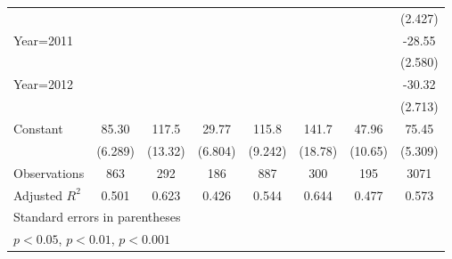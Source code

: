 \begin{table}[htbp]
\begin{tabular}{l*{7}{c}}
                &                  &                  &                  &                  &                  &                  &  (2.427)         \\
Year=2011       &                  &                  &                  &                  &                  &                  &   -28.55\sym{***}\\
                &                  &                  &                  &                  &                  &                  &  (2.580)         \\
Year=2012       &                  &                  &                  &                  &                  &                  &   -30.32\sym{***}\\
                &                  &                  &                  &                  &                  &                  &  (2.713)         \\
Constant        &    85.30\sym{***}&    117.5\sym{***}&    29.77\sym{***}&    115.8\sym{***}&    141.7\sym{***}&    47.96\sym{***}&    75.45\sym{***}\\
                &  (6.289)         &  (13.32)         &  (6.804)         &  (9.242)         &  (18.78)         &  (10.65)         &  (5.309)         \\
\midrule
Observations    &      863         &      292         &      186         &      887         &      300         &      195         &     3071         \\
Adjusted \(R^{2}\)&    0.501         &    0.623         &    0.426         &    0.544         &    0.644         &    0.477         &    0.573         \\
\bottomrule
\multicolumn{8}{l}{\footnotesize Standard errors in parentheses}\\
\multicolumn{8}{l}{\footnotesize \sym{*} \(p<0.05\), \sym{**} \(p<0.01\), \sym{***} \(p<0.001\)}\\
\end{tabular}
\end{table}
